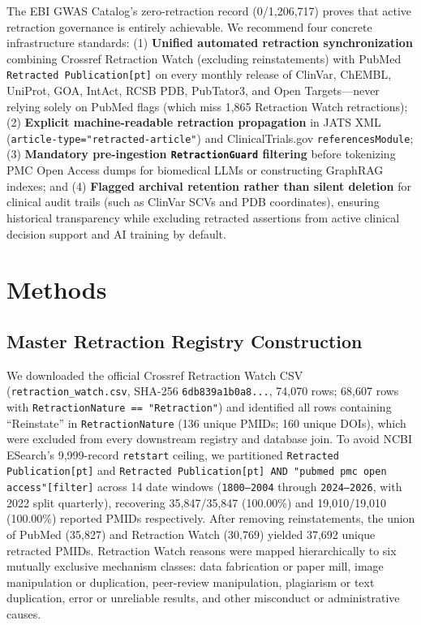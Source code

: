 \documentclass[11pt,letterpaper]{article}
\begin{document}
The EBI GWAS Catalog's zero-retraction record (0/1,206,717) proves that active retraction governance is entirely achievable. We recommend four concrete infrastructure standards: (1) \textbf{Unified automated retraction synchronization} combining Crossref Retraction Watch (excluding reinstatements) with PubMed \texttt{Retracted Publication[pt]} on every monthly release of ClinVar, ChEMBL, UniProt, GOA, IntAct, RCSB PDB, PubTator3, and Open Targets—never relying solely on PubMed flags (which miss 1,865 Retraction Watch retractions); (2) \textbf{Explicit machine-readable retraction propagation} in JATS XML (\texttt{article-type="retracted-article"}) and ClinicalTrials.gov \texttt{referencesModule}; (3) \textbf{Mandatory pre-ingestion \texttt{RetractionGuard} filtering} before tokenizing PMC Open Access dumps for biomedical LLMs or constructing GraphRAG indexes; and (4) \textbf{Flagged archival retention rather than silent deletion} for clinical audit trails (such as ClinVar SCVs and PDB coordinates), ensuring historical transparency while excluding retracted assertions from active clinical decision support and AI training by default.

\section{Methods}
\subsection{Master Retraction Registry Construction}
We downloaded the official Crossref Retraction Watch CSV (\texttt{retraction\_watch.csv}, SHA-256 \texttt{6db839a1b0a8...}, 74,070 rows; 68,607 rows with \texttt{RetractionNature == "Retraction"}) and identified all rows containing ``Reinstate'' in \texttt{RetractionNature} (136 unique PMIDs; 160 unique DOIs), which were excluded from every downstream registry and database join. To avoid NCBI ESearch's 9,999-record \texttt{retstart} ceiling, we partitioned \texttt{Retracted Publication[pt]} and \texttt{Retracted Publication[pt] AND "pubmed pmc open access"[filter]} across 14 date windows (\texttt{1800--2004} through \texttt{2024--2026}, with 2022 split quarterly), recovering 35,847/35,847 (100.00\%) and 19,010/19,010 (100.00\%) reported PMIDs respectively. After removing reinstatements, the union of PubMed (35,827) and Retraction Watch (30,769) yielded 37,692 unique retracted PMIDs. Retraction Watch reasons were mapped hierarchically to six mutually exclusive mechanism classes: data fabrication or paper mill, image manipulation or duplication, peer-review manipulation, plagiarism or text duplication, error or unreliable results, and other misconduct or administrative causes.
\end{document}
